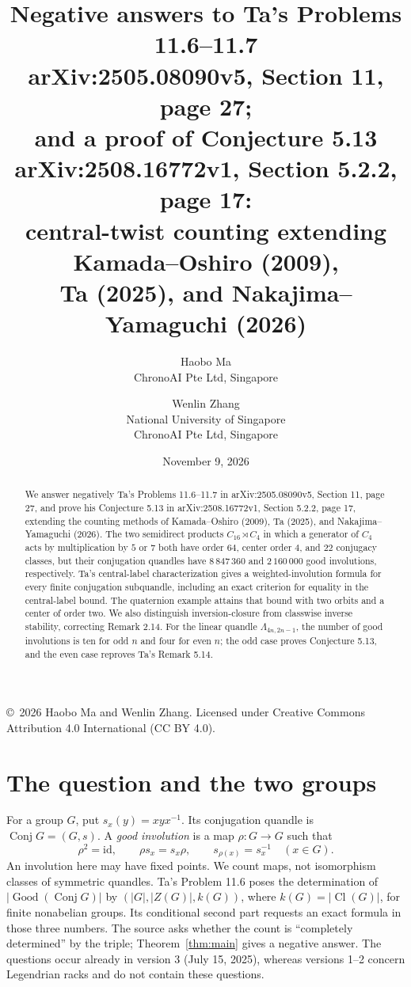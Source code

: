 \documentclass[11pt]{article}
\title{Negative answers to Ta's Problems 11.6--11.7\\
\large arXiv:2505.08090v5, Section 11, page 27;\\
and a proof of Conjecture 5.13\\
arXiv:2508.16772v1, Section 5.2.2, page 17:\\
central-twist counting extending Kamada--Oshiro (2009),\\
Ta (2025), and Nakajima--Yamaguchi (2026)}
\author{Haobo Ma\\{\small ChronoAI Pte Ltd, Singapore}
\and Wenlin Zhang\\{\small National University of Singapore}\\
{\small ChronoAI Pte Ltd, Singapore}}
\date{November 9, 2026}
\newcommand{\Good}{\operatorname{Good}}
\newcommand{\Conj}{\operatorname{Conj}}
\newcommand{\Cl}{\operatorname{Cl}}
\begin{document}
\maketitle
\begin{abstract}
We answer negatively Ta's Problems 11.6--11.7 in arXiv:2505.08090v5,
Section 11, page 27, and prove his Conjecture 5.13 in
arXiv:2508.16772v1, Section 5.2.2, page 17, extending the counting
methods of Kamada--Oshiro (2009), Ta (2025), and
Nakajima--Yamaguchi (2026).
The two semidirect products $C_{16}\rtimes C_4$ in which a generator of
$C_4$ acts by multiplication by $5$ or $7$ both have order $64$, center
order $4$, and $22$ conjugacy classes, but their conjugation quandles have
$8\,847\,360$ and $2\,160\,000$ good involutions, respectively.
Ta's central-label characterization gives a weighted-involution formula
for every finite conjugation subquandle, including an exact criterion
for equality in the central-label bound. The quaternion example attains
that bound with two orbits and a center of order two. We also distinguish
inversion-closure from classwise inverse stability, correcting Remark 2.14.
For the linear quandle $\Lambda_{4n,2n-1}$, the number of good
involutions is ten for odd $n$ and four for even $n$; the odd case
proves Conjecture 5.13, and the even case reproves Ta's Remark 5.14.
\end{abstract}
\begin{center}\small
\copyright\ 2026 Haobo Ma and Wenlin Zhang.
Licensed under Creative Commons Attribution 4.0 International (CC BY 4.0).
\end{center}

\section{The question and the two groups}
For a group $G$, put $s_x(y)=xyx^{-1}$. Its conjugation quandle is
$\Conj G=(G,s)$. A \emph{good involution} is a map $\rho:G\to G$ such that
\begin{equation}\label{eq:good}
 \rho^2=\mathrm{id},\qquad \rho s_x=s_x\rho,\qquad
 s_{\rho(x)}=s_x^{-1}\quad(x\in G).
\end{equation}
An involution here may have fixed points. We count maps, not isomorphism
classes of symmetric quandles. Ta's Problem 11.6 \cite[p.~27]{Ta}
poses the determination of $|\Good(\Conj G)|$ by
$(|G|,|Z(G)|,k(G))$, where $k(G)=|\Cl(G)|$, for finite nonabelian groups.
Its conditional second part requests an exact formula in those three numbers.
The source asks whether the count is ``completely determined'' by the
triple; Theorem~\ref{thm:main} gives a negative answer.
The questions occur already in version 3 (July 15, 2025), whereas
versions 1--2 concern Legendrian racks and do not contain these questions.
\end{document}
